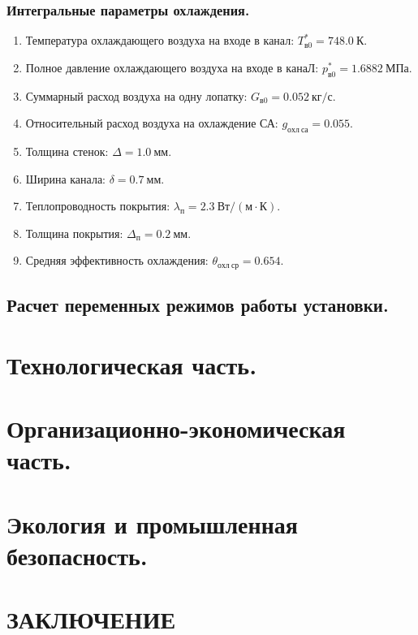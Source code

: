 \documentclass[a4paper,12pt]{article}
\begin{document}
    \subsubsection{Интегральные параметры охлаждения.}
%    
    \begin{enumerate}

        \item Температура охлаждающего воздуха на входе в канал:
            $ T_{в0}^{*} = 748.0\ К$.
        \item Полное давление охлаждающего воздуха на входе в канаЛ:
            $ p_{в0}^* = 1.6882\ МПа $.
        \item Суммарный расход воздуха на одну лопатку: $G_{в0} = 0.052\ кг/с$.
        \item Относительный расход воздуха на охлаждение СА:
            $g_{охл\ са} = 0.055$.
        \item Толщина стенок: $\Delta = 1.0\ мм$.
        \item Ширина канала: $\delta = 0.7\ мм$.
        \item Теплопроводность покрытия: $\lambda_п = 2.3\ Вт/(м \cdot К)$.
        \item Толщина покрытия: $\Delta_п = 0.2\ мм$.
        \item Средняя эффективность охлаждения: $\theta_{охл\ ср} = 0.654$.
    \end{enumerate}
    


    \subsection{Расчет переменных режимов работы установки.}

    \section{Технологическая часть.}
    \section{Организационно-экономическая часть.}
    \section{Экология и промышленная безопасность.}

    \section{ЗАКЛЮЧЕНИЕ}
\end{document}
